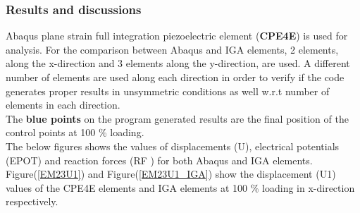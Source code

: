 \documentclass[11pt]{article}
\begin{document}
\subsubsection{Results and discussions} \label{RSD2DPPUML}
Abaqus plane strain full integration piezoelectric element (\textbf{CPE4E}) is used for analysis. For the comparison between Abaqus and IGA elements, 2 elements, along the x-direction and 3 elements along the y-direction, are used. A different number of elements are used along each direction in order to verify if the code generates proper results in unsymmetric conditions as well w.r.t number of elements in each direction.\\
The \textbf{blue points} on the program generated results are the final position of the control points at 100 \% loading.\\
The below figures shows the values of displacements (U), electrical potentials (EPOT) and reaction forces (RF ) for both Abaqus and IGA elements.\\
Figure(\ref{EM23U1}) and Figure(\ref{EM23U1_IGA}) show the displacement (U1) values of the CPE4E elements and IGA elements at 100 \% loading in x-direction respectively. \\
\end{document}
